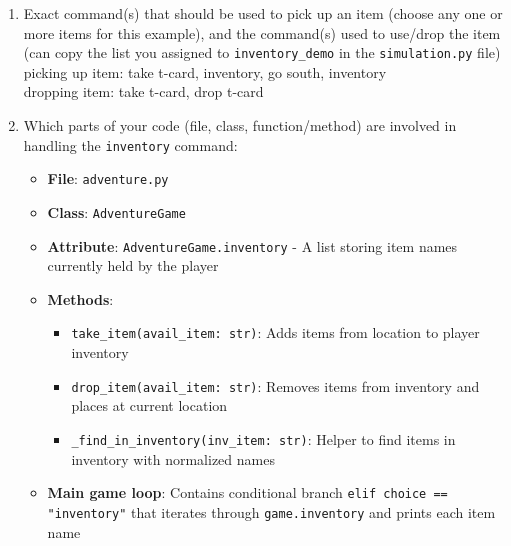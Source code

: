 \documentclass[11pt]{article}
\begin{document}
\begin{enumerate}
\begin{enumerate}
\begin{itemize}
    \item Item name: spare room key 
    \item Item start location ID: 103 
    \item Item target location ID: 101
\end{itemize}
    \item \textbf{Item 7}:
\begin{itemize}
    \item Item name: toonie
    \item Item start location ID: 601
    \item Item target location ID: 613
\end{itemize}
    \item \textbf{Item 8}:
\begin{itemize}
    \item Item name: t-card
    \item Item start location ID: 101
    \item Item target location ID: 3
\end{itemize}
\end{enumerate}

    \item Exact command(s) that should be used to pick up an item (choose any one or more items for this example), and the command(s) used to use/drop the item (can copy the list you assigned to \texttt{inventory\_demo} in the \texttt{simulation.py} file)\\
    picking up item: take t-card, inventory, go south, inventory\\
    dropping item: take t-card, drop t-card\\
    \item Which parts of your code (file, class, function/method) are involved in handling the \texttt{inventory} command:
\begin{itemize}
    \item \textbf{File}: \texttt{adventure.py}
    \item \textbf{Class}: \texttt{AdventureGame}
    \item \textbf{Attribute}: \texttt{AdventureGame.inventory} - A list storing item names currently held by the player
    \item \textbf{Methods}:
    \begin{itemize}
        \item \texttt{take\_item(avail\_item: str)}: Adds items from location to player inventory
        \item \texttt{drop\_item(avail\_item: str)}: Removes items from inventory and places at current location
        \item \texttt{\_find\_in\_inventory(inv\_item: str)}: Helper to find items in inventory with normalized names
    \end{itemize}
    \item \textbf{Main game loop}: Contains conditional branch \texttt{elif choice == "inventory"} that iterates through \texttt{game.inventory} and prints each item name
\end{itemize}
\end{enumerate}
\end{document}
